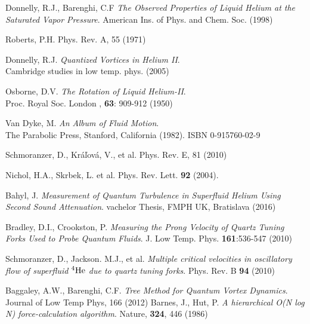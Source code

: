 \begin{thebibliography}{99}
	{\sc Donnelly, R.J., Barenghi, C.F}
	\emph{The Observed Properties of Liquid Helium at the Saturated Vapor Pressure}. American Ins. of Phys. and Chem. Soc. (1998)

	{\sc Roberts, P.H.}
	\emph{} Phys. Rev. A, 55 (1971)

	{\sc Donnelly, R.J.}
	\emph{Quantized Vortices in Helium II}.\\
	Cambridge studies in low temp. phys. (2005)

	{\sc Osborne, D.V.}
	\emph{The Rotation of Liquid Helium-II}.\\
	Proc. Royal Soc. London , \textbf{63}: 909-912 (1950)

	{\sc Van Dyke, M.}
	\emph{An Album of Fluid Motion}.\\
	The Parabolic Press, Stanford, California (1982). ISBN 0-915760-02-9

	{\sc Schmoranzer, D., Kráľová, V., et al.}
	\emph{}	Phys. Rev. E, 81 (2010)

	{\sc Nichol, H.A., Skrbek, L. et al.}
	\emph{} Phys. Rev. Lett. \textbf{92} (2004).


	{\sc Bahyl, J.}
	\emph{Measurement of Quantum Turbulence in Superfluid Helium Using Second Sound Attenuation}.
	vachelor Thesis, FMPH UK, Bratislava (2016)

	{\sc Bradley, D.I., Crookston, P.} 
	\emph{Measuring the Prong Velocity of Quartz Tuning Forks Used to Probe Quantum Fluids}.
	J. Low Temp. Phys. \textbf{161}:536-547 (2010)

	{\sc Schmoranzer, D., Jackson. M.J., et al.}
	\emph{Multiple critical velocities in oscillatory flow of superfluid ${}^4\mathrm{He}$ due to quartz tuning forks}.
	Phys. Rev. B \textbf{94} (2010)


















	{\sc Baggaley, A.W., Barenghi, C.F.}
	\emph{Tree Method for Quantum Vortex Dynamics}. Journal of Low Temp Phys, 166 (2012)
	{\sc Barnes, J., Hut, P.}
	\emph{A hierarchical O(N log N) force-calculation algorithm}. Nature, \textbf{324}, 446 (1986)

\end{thebibliography}
